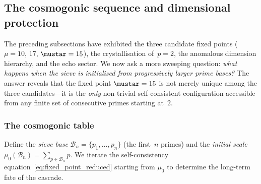 \documentclass[12pt,a4paper]{article}
\begin{document}
\subsection{The cosmogonic sequence and dimensional protection}
\label{sec:ch8_cosmogonic_sequence}

The preceding subsections have exhibited the three candidate fixed
points ($\mu = 10$, $17$, $\mustar = 15$), the crystallisation
of~$p = 2$, the anomalous dimension hierarchy, and the echo sector.
We now ask a more sweeping question: \emph{what happens when the sieve
is initialised from progressively larger prime bases?}  The answer
reveals that the fixed point $\mustar = 15$ is not merely unique
among the three candidates---it is the \emph{only} non-trivial
self-consistent configuration accessible from any finite set of
consecutive primes starting at~$2$.

\subsubsection{The cosmogonic table}

Define the \emph{sieve base} $\mathcal{B}_n = \{p_1, \ldots, p_n\}$
(the first~$n$ primes) and the \emph{initial scale}
$\mu_0(\mathcal{B}_n) = \sum_{p \in \mathcal{B}_n} p$.  We iterate
the self-consistency equation~\eqref{eq:fixed_point_reduced}
starting from $\mu_0$ to determine the long-term fate of the
cascade.
\end{document}
